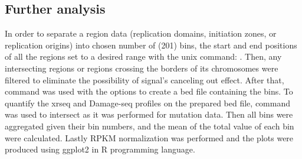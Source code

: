 \subsection{Further analysis}
In order to separate a region data (replication domains, initiation zones, or replication origins) into chosen number of (201) bins, the start and end positions of all the regions set to a desired range with the unix command:   . Then, any intersecting regions or regions crossing the borders of its chromosomes were filtered to eliminate the possibility of signal's canceling out effect. After that,  command was used with the  options to create a bed file containing the bins.
To quantify the \gls{xrseq} and Damage-seq profiles on the prepared bed file,  command was used to intersect as it was performed for mutation data. Then all bins were aggregated given their bin numbers, and the mean of the total value of each bin were calculated. Lastly RPKM normalization was performed and the plots were produced using ggplot2 in R programming language.